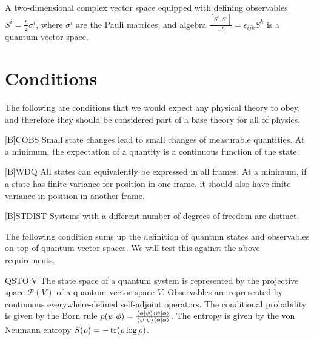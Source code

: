 \documentclass{techbrief}
\begin{document}
\begin{example}[Qubit]
	A two-dimensional complex vector space equipped with defining observables $S^i = \frac{\hbar}{2}\sigma^i$, where $\sigma^i$ are the Pauli matrices, and algebra $\frac{[S^i, S^j]}{\imath \hbar} = \epsilon_{ijk} S^k$ is a quantum vector space.
\end{example}

\section{Conditions}

The following are conditions that we would expect any physical theory to obey, and therefore they should be considered part of a base theory for all of physics.

\begin{condition}{[B]COBS}
	Small state changes lead to small changes of measurable quantities. At a minimum, the expectation of a quantity is a continuous function of the state.
\end{condition}

\begin{condition}{[B]WDQ}
	All states can equivalently be expressed in all frames. At a minimum, if a state has finite variance for position in one frame, it should also have finite variance in position in another frame.
\end{condition}

\begin{condition}{[B]STDIST}
	Systems with a different number of degrees of freedom are distinct.
\end{condition}

The following condition sums up the definition of quantum states and observables on top of quantum vector spaces. We will test this against the above requirements.

\begin{condition}{QSTO:V}
	The state space of a quantum system is represented by the projective space $\mathcal{P}(V)$ of a quantum vector space $V$. Observables are represented by continuous everywhere-defined self-adjoint operators. The conditional probability is given by the Born rule $p(\psi|\phi) = \frac{\langle \phi | \psi \rangle\langle \psi | \phi \rangle}{\langle \psi | \psi \rangle\langle \phi | \phi \rangle}$.  The entropy is given by the von Neumann entropy $S(\rho) = -\operatorname{tr}(\rho \log \rho)$.
\end{condition}
\end{document}
